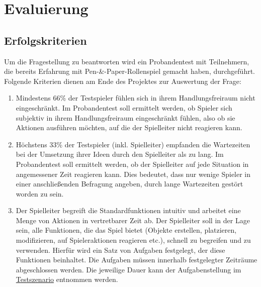 \chapter{Evaluierung}
\label{evaluation}


\section{Erfolgskriterien}
\label{sec:Erfolgskriterien}
Um die Fragestellung zu beantworten wird ein Probandentest mit Teilnehmern, die bereits Erfahrung mit Pen-\&-Paper-Rollenspiel gemacht haben, durchgeführt. Folgende Kriterien dienen am Ende des Projektes zur
Auswertung der Frage:

\begin{enumerate}
	\item Mindestens 66\% der Testspieler fühlen sich in ihrem Handlungsfreiraum nicht eingeschränkt. Im Probandentest soll ermittelt werden, ob Spieler sich subjektiv in ihrem Handlungsfreiraum eingeschränkt fühlen, also ob sie Aktionen ausführen möchten, auf die der Spielleiter nicht reagieren kann.
	\item Höchstens 33\% der Testspieler (inkl. Spielleiter) empfanden die Wartezeiten bei der Umsetzung ihrer Ideen durch den Spielleiter als zu lang. Im Probandentest soll ermittelt werden, ob der Spielleiter auf jede Situation in angemessener Zeit reagieren kann. Dies bedeutet, dass nur wenige Spieler in einer anschließenden Befragung angeben, durch lange Wartezeiten gestört worden zu sein.
	\item Der Spielleiter begreift die Standardfunktionen intuitiv und arbeitet eine Menge von Aktionen in vertretbarer Zeit ab. Der Spielleiter soll in der Lage sein, alle Funktionen, die das Spiel bietet (Objekte erstellen, platzieren, modifizieren, auf Spieleraktionen reagieren etc.), schnell zu begreifen und zu verwenden. Hierfür wird ein Satz von Aufgaben festgelegt, der diese Funktionen beinhaltet. Die Aufgaben müssen innerhalb festgelegter Zeiträume abgeschlossen werden. Die jeweilige Dauer kann der Aufgabenstellung im \hyperlink{AppendixSpielleiter.1}{Testszenario} entnommen werden.
\end{enumerate}

